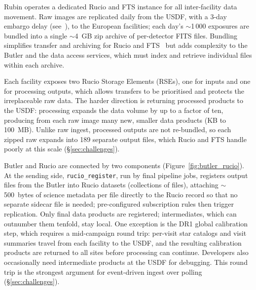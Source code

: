 Rubin operates a dedicated Rucio and FTS instance for all inter-facility data movement.
Raw images are replicated daily from the USDF, with a 3-day embargo delay (see~\cite{DMTN-199}), to the European facilities; each day's $\sim$1\,000 exposures are bundled into a single $\sim$4~GB zip archive of per-detector FITS files.
Bundling simplifies transfer and archiving for Rucio and FTS~\cite{2025EPJWC.33701129H} but adds complexity to the Butler and the data access services, which must index and retrieve individual files within each archive.

Each facility exposes two Rucio Storage Elements (RSEs), one for inputs and one for processing outputs, which allows transfers to be prioritised and protects the irreplaceable raw data.
The harder direction is returning processed products to the USDF: processing expands the data volume by up to a factor of ten, producing from each raw image many new, smaller data products (KB to 100~MB).
Unlike raw ingest, processed outputs are not re-bundled, so each zipped raw expands into 189 separate output files, which Rucio and FTS handle poorly at this scale (\S\ref{sec:challenges}).

Butler and Rucio are connected by two components (Figure~\ref{fig:butler_rucio}).
At the sending side, \texttt{rucio\_register}, run by final pipeline jobs, registers output files from the Butler into Rucio datasets (collections of files), attaching $\sim$500~bytes of science metadata per file directly to the Rucio record so that no separate sidecar file is needed; pre-configured subscription rules then trigger replication.
Only final data products are registered; intermediates, which can outnumber them tenfold, stay local.
One exception is the DR1 global calibration step, which requires a mid-campaign round trip: per-visit star catalogs and visit summaries travel from each facility to the USDF, and the resulting calibration products are returned to all sites before processing can continue.
Developers also occasionally need intermediate products at the USDF for debugging.
This round trip is the strongest argument for event-driven ingest over polling (\S\ref{sec:challenges}).

